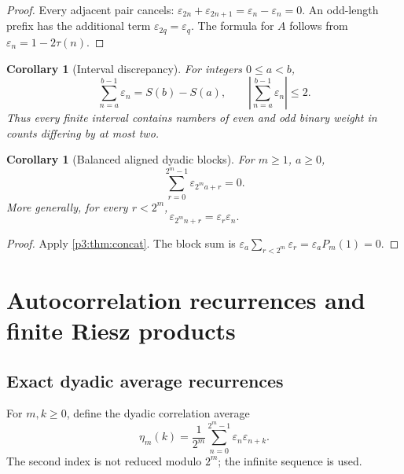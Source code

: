 \documentclass[11pt,oneside]{article}
\newtheorem{corollary}[theorem]{Corollary}
\theoremstyle{definition}
\theoremstyle{remark}
\newcommand{\eps}{\varepsilon}
\newcommand{\1}{\mathbf 1}
\begin{document}
\begin{proof}
Every adjacent pair cancels:
\(\eps_{2n}+\eps_{2n+1}=\eps_n-\eps_n=0\).  An odd-length prefix has the additional term
\(\eps_{2q}=\eps_q\).  The formula for \(A\) follows from
\(\eps_n=1-2\tau(n)\).
\end{proof}

\begin{corollary}[Interval discrepancy]
\label{p3:cor:interval-discrepancy}
For integers \(0\le a<b\),
\begin{equation}
 \sum_{n=a}^{b-1}\eps_n=S(b)-S(a),
 \qquad
 \left|\sum_{n=a}^{b-1}\eps_n\right|\le2.
 \label{p3:eq:interval-discrepancy}
\end{equation}
Thus every finite interval contains numbers of even and odd binary weight in counts differing
by at most two.
\end{corollary}

\begin{corollary}[Balanced aligned dyadic blocks]
\label{p3:cor:dyadic-block-balance}
For \(m\ge1\), \(a\ge0\),
\begin{equation}
 \sum_{r=0}^{2^m-1}\eps_{2^ma+r}=0.
 \label{p3:eq:dyadic-block-balance}
\end{equation}
More generally, for every \(r<2^m\),
\begin{equation}
 \eps_{2^mn+r}=\eps_r\eps_n.
 \label{p3:eq:power-two-progressions}
\end{equation}
\end{corollary}

\begin{proof}
Apply \cref{p3:thm:concat}.  The block sum is
\(\eps_a\sum_{r<2^m}\eps_r=\eps_aP_m(1)=0\).
\end{proof}

\section{Autocorrelation recurrences and finite Riesz products}
\label{p3:sec:correlation}

\subsection{Exact dyadic average recurrences}

For \(m,k\ge0\), define the dyadic correlation average
\begin{equation}
 \eta_m(k)=\frac1{2^m}\sum_{n=0}^{2^m-1}\eps_n\eps_{n+k}.
 \label{p3:eq:eta-m}
\end{equation}
The second index is not reduced modulo \(2^m\); the infinite sequence is used.
\end{document}
